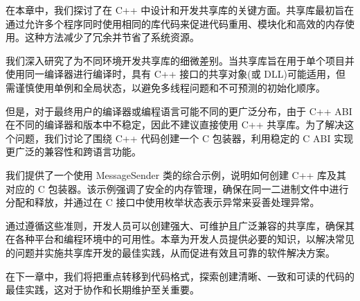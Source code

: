 在本章中，我们探讨了在 C++ 中设计和开发共享库的关键方面。共享库最初旨在通过允许多个程序同时使用相同的库代码来促进代码重用、模块化和高效的内存使用。这种方法减少了冗余并节省了系统资源。

我们深入研究了为不同环境开发共享库的细微差别。当共享库旨在用于单个项目并使用同一编译器进行编译时，具有 C++ 接口的共享对象(或 DLL)可能适用，但需谨慎使用单例和全局状态，以避免多线程问题和不可预测的初始化顺序。

但是，对于最终用户的编译器或编程语言可能不同的更广泛分布，由于 C++ ABI 在不同的编译器和版本中不稳定，因此不建议直接使用 C++ 共享库。为了解决这个问题，我们讨论了围绕 C++ 代码创建一个 C 包装器，利用稳定的 C ABI 实现更广泛的兼容性和跨语言功能。

我们提供了一个使用 MessageSender 类的综合示例，说明如何创建 C++ 库及其对应的 C 包装器。该示例强调了安全的内存管理，确保在同一二进制文件中进行分配和释放，并通过在 C 接口中使用枚举状态表示异常来妥善处理异常。

通过遵循这些准则，开发人员可以创建强大、可维护且广泛兼容的共享库，确保其在各种平台和编程环境中的可用性。本章为开发人员提供必要的知识，以解决常见的问题并实施共享库开发的最佳实践，从而促进有效且可靠的软件解决方案。

在下一章中，我们将把重点转移到代码格式，探索创建清晰、一致和可读的代码的最佳实践，这对于协作和长期维护至关重要。
